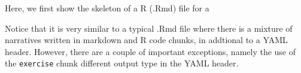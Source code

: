 Here, we first show the skeleton of a R \DIFdelbegin {}\DIFdelend \DIFaddbegin {}\DIFaddend (.Rmd) file for a
\DIFdelbegin \emph{} %




{%
}%

\DIFdelend \DIFaddbegin {} \DIFaddend Notice that it is very similar to
a typical .Rmd file where there is a mixture of narratives written in
markdown and R code chunks, in addtional to a YAML header. However,
there are a couple of important exceptions, namely the use of the
\texttt{exercise} chunk \DIFdelbegin {}\DIFdelend \DIFaddbegin {}\DIFaddend different output type in the YAML header.

